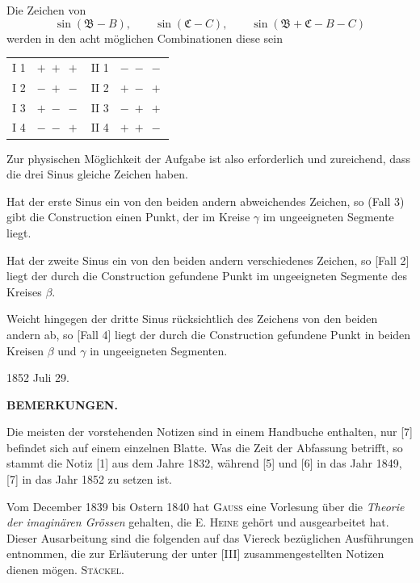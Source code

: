 
Die Zeichen von
\[ \sin(\mathfrak{B}-B), \qquad \sin(\mathfrak{C}-C), \qquad \sin(\mathfrak{B}+\mathfrak{C}-B-C) \]
werden in den acht möglichen Combinationen diese sein

\begin{center}
\begin{tabular}{cc|cc}
I 1 & $+\;+\;+$ & II 1 & $-\;-\;-$ \\
I 2 & $-\;+\;-$ & II 2 & $+\;-\;+$ \\
I 3 & $+\;-\;-$ & II 3 & $-\;+\;+$ \\
I 4 & $-\;-\;+$ & II 4 & $+\;+\;-$ \\
\end{tabular}
\end{center}

Zur physischen Möglichkeit der Aufgabe ist also erforderlich und zureichend, dass die drei Sinus gleiche Zeichen haben.

Hat der erste Sinus ein von den beiden andern abweichendes Zeichen, so (Fall 3) gibt die Construction einen Punkt, der im Kreise $\gamma$ im ungeeigneten Segmente liegt.

Hat der zweite Sinus ein von den beiden andern verschiedenes Zeichen, so [Fall 2] liegt der durch die Construction gefundene Punkt im ungeeigneten Segmente des Kreises $\beta$.

Weicht hingegen der dritte Sinus rücksichtlich des Zeichens von den beiden andern ab, so [Fall 4] liegt der durch die Construction gefundene Punkt in beiden Kreisen $\beta$ und $\gamma$ in ungeeigneten Segmenten.

\hfill 1852 Juli 29.

\medskip

\begin{center}
\textbf{BEMERKUNGEN.}
\end{center}

Die meisten der vorstehenden Notizen sind in einem Handbuche enthalten, nur [7] befindet sich auf einem einzelnen Blatte. Was die Zeit der Abfassung betrifft, so stammt die Notiz [1] aus dem Jahre 1832, während [5] und [6] in das Jahr 1849, [7] in das Jahr 1852 zu setzen ist.

Vom December 1839 bis Ostern 1840 hat \textsc{Gauss} eine Vorlesung über die \emph{Theorie der imaginären Grössen} gehalten, die E. \textsc{Heine} gehört und ausgearbeitet hat. Dieser Ausarbeitung sind die folgenden auf das Viereck bezüglichen Ausführungen entnommen, die zur Erläuterung der unter [III] zusammengestellten Notizen dienen mögen. \hfill \textsc{Stäckel}.
